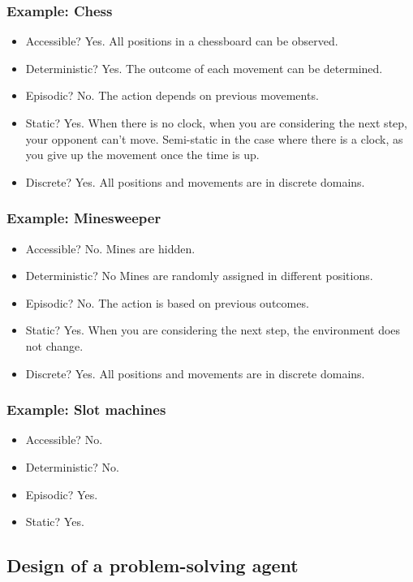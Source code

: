 \documentclass[11pt]{article}
\begin{document}
\subsubsection{Example: Chess}
\label{sec:org52706b5}
\begin{itemize}
\item Accessible? Yes. All positions in a chessboard can be observed.
\item Deterministic? Yes. The outcome of each movement can be determined.
\item Episodic? No. The action depends on previous movements.
\item Static? Yes. When there is no clock, when you are considering the next step, your opponent can't move. Semi-static in the case where there is a clock, as you give up the movement once the time is up.
\item Discrete? Yes. All positions and movements are in discrete domains.
\end{itemize}
\subsubsection{Example: Minesweeper}
\label{sec:org7146254}
\begin{itemize}
\item Accessible? No. Mines are hidden.
\item Deterministic? No Mines are randomly assigned in different positions.
\item Episodic? No. The action is based on previous outcomes.
\item Static? Yes. When you are considering the next step, the environment does not change.
\item Discrete? Yes. All positions and movements are in discrete domains.
\end{itemize}
\subsubsection{Example: Slot machines}
\label{sec:org826182f}
\begin{itemize}
\item Accessible? No.
\item Deterministic? No.
\item Episodic? Yes.
\item Static? Yes.
\end{itemize}
\subsection{Design of a problem-solving agent}
\label{sec:orgdc45458}
\end{document}
